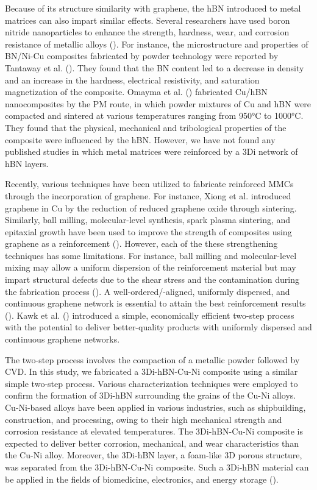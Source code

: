 Because of its structure similarity with graphene, the hBN introduced to metal matrices can also impart similar effects. Several researchers have used boron nitride nanoparticles to enhance the strength, hardness, wear, and corrosion resistance of metallic alloys (\cite{gopinath2020enhancing, reddy2013study, zitoun2008microstructure, khatavkar2018influence, cho2018effect}). For instance, the microstructure and properties of BN/Ni-Cu composites fabricated by powder technology were reported by Tantaway et al. (\cite{el2018microstructure}). They found that the BN content led to a decrease in density and an increase in the hardness, electrical resistivity, and saturation magnetization of the composite. Omayma et al. (\cite{elkady2015physico}) fabricated Cu/hBN nanocomposites by the PM route, in which powder mixtures of Cu and hBN were compacted and sintered at various temperatures ranging from 950°C to 1000°C. They found that the physical, mechanical and tribological properties of the composite were influenced by the hBN. However, we have not found any published studies in which metal matrices were reinforced by a 3Di network of hBN layers.

Recently, various techniques have been utilized to fabricate reinforced MMCs through the incorporation of graphene. For instance, Xiong et al. introduced graphene in Cu by the reduction of reduced graphene oxide through sintering. Similarly, ball milling, molecular-level synthesis, spark plasma sintering, and epitaxial growth have been used to improve the strength of composites using graphene as a reinforcement (\cite{chen2016fabrication, cao2017aligning, jiang2016copper, wang2019direct}). However, each of the these strengthening techniques has some limitations. For instance, ball milling and molecular-level mixing may allow a uniform dispersion of the reinforcement material but may impart structural defects due to the shear stress and the contamination during the fabrication process (\cite{naseer2019review}). A well-ordered/-aligned, uniformly dispersed, and continuous graphene network is essential to attain the best reinforcement results (\cite{chen2016fabrication}). Kawk et al. (\cite{kawk2019simple}) introduced a simple, economically efficient two-step process with the potential to deliver better-quality products with uniformly dispersed and continuous graphene networks.

The two-step process involves the compaction of a metallic powder followed by CVD. In this study, we fabricated a 3Di-hBN-Cu-Ni composite using a similar simple two-step process. Various characterization techniques were employed to confirm the formation of 3Di-hBN surrounding the grains of the Cu-Ni alloys. Cu-Ni-based alloys have been applied in various industries, such as shipbuilding, construction, and processing, owing to their high mechanical strength and corrosion resistance at elevated temperatures. The 3Di-hBN-Cu-Ni composite is expected to deliver better corrosion, mechanical, and wear characteristics than the Cu-Ni alloy. Moreover, the 3Di-hBN layer, a foam-like 3D porous structure, was separated from the 3Di-hBN-Cu-Ni composite. Such a 3Di-hBN material can be applied in the fields of biomedicine, electronics, and energy storage (\cite{gautam2018synthesis, guiney2018three, yin2013ultralight}).

